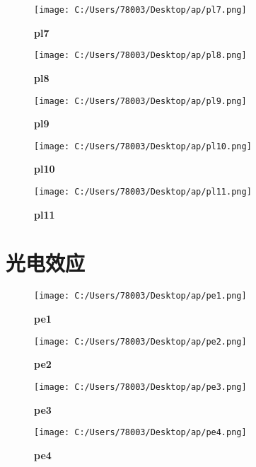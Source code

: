 \documentclass[UTF8]{report}
\theoremstyle{MyLineTheoremStyle} %
\theoremstyle{MyBlockTheoremStyle} %
\theoremstyle{MySubsubsectionStyle} %
\begin{document}
\begin{figure}[ht]
    \centering
    \texttt{[image: C:/Users/78003/Desktop/ap/pl7.png]}
    \caption{\textbf{pl7}}
    \label{fig:pl7}
\end{figure}

\begin{figure}[ht]
    \centering
    \texttt{[image: C:/Users/78003/Desktop/ap/pl8.png]}
    \caption{\textbf{pl8}}
    \label{fig:pl8}
\end{figure}

\begin{figure}[ht]
    \centering
    \texttt{[image: C:/Users/78003/Desktop/ap/pl9.png]}
    \caption{\textbf{pl9}}
    \label{fig:pl9}
\end{figure}

\begin{figure}[ht]
    \centering
    \texttt{[image: C:/Users/78003/Desktop/ap/pl10.png]}
    \caption{\textbf{pl10}}
    \label{fig:pl10}
\end{figure}

\begin{figure}[ht]
    \centering
    \texttt{[image: C:/Users/78003/Desktop/ap/pl11.png]}
    \caption{\textbf{pl11}}
    \label{fig:pl11}
\end{figure}

\cleardoublepage
\section{光电效应}

\begin{figure}[ht]
    \centering
    \texttt{[image: C:/Users/78003/Desktop/ap/pe1.png]}
    \caption{\textbf{pe1}}
    \label{fig:pe1}
\end{figure}

\begin{figure}[ht]
    \centering
    \texttt{[image: C:/Users/78003/Desktop/ap/pe2.png]}
    \caption{\textbf{pe2}}
    \label{fig:pe2}
\end{figure}

\begin{figure}[ht]
    \centering
    \texttt{[image: C:/Users/78003/Desktop/ap/pe3.png]}
    \caption{\textbf{pe3}}
    \label{fig:pe3}
\end{figure}

\begin{figure}[ht]
    \centering
    \texttt{[image: C:/Users/78003/Desktop/ap/pe4.png]}
    \caption{\textbf{pe4}}
    \label{fig:pe4}
\end{figure}
\end{document}
